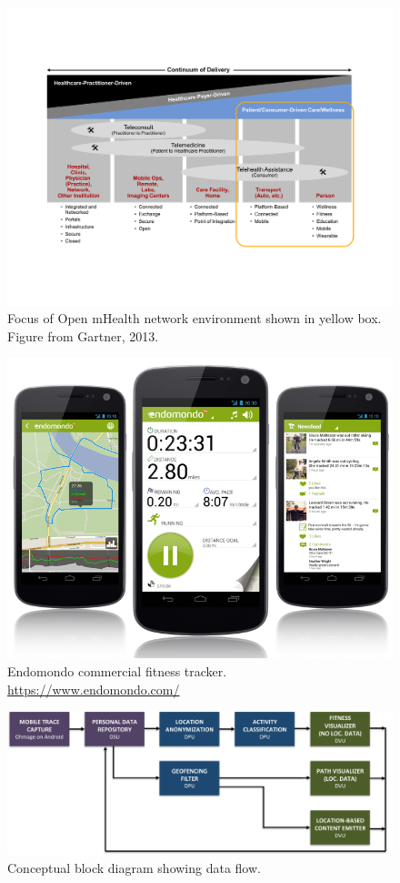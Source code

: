 \begin{figure}
\begin{center}
\includegraphics[width=.8\textwidth]{figures/continuum}
\caption{{Focus of Open mHealth network environment shown in yellow box. Figure from Gartner, 2013.  }}
\label{fig:continuum}
\end{center}
\end{figure}

\begin{figure}
\begin{center}
\includegraphics[width=.6\textwidth]{figures/endomondo}
\caption{Endomondo commercial fitness tracker. \protect\url{https://www.endomondo.com/}}
\label{fig:endomondo}
\end{center}
\end{figure}

\begin{figure}
\begin{center}
\includegraphics[width=1\textwidth]{figures/ConceptualBlock}
\caption{Conceptual block diagram showing data flow.}
\label{fig:ConceptualBlock}
\end{center}
\end{figure}

